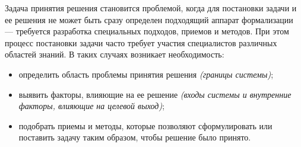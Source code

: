 \documentclass[a4paper,12pt,oneside,final]{extarticle}
\numberwithin{equation}{section}
\begin{document}
Задача принятия решения становится проблемой, когда для постановки задачи и ее решения не может быть сразу определен подходящий аппарат формализации --- требуется разработка специальных подходов, приемов и методов. 
При этом процесс постановки задачи часто требует участия специалистов различных областей знаний. В таких случаях возникает необходимость:
\begin{itemize}
	\item определить область проблемы принятия решения \textit{(границы системы)};
	\item выявить факторы, влияющие на ее решение \textit{(входы системы и внутренние факторы, влияющие на целевой выход)};
	\item подобрать приемы и методы, которые позволяют сформулировать или поставить задачу таким образом, чтобы решение было принято.
\end{itemize}
\end{document}
